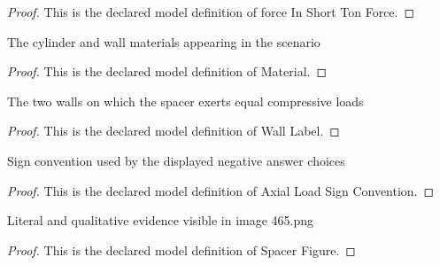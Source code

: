 \begin{proof}
  This is the declared model definition of force In Short Ton Force.
\end{proof}
\begin{definition}[Material]
  \label{def:physics:phyx-mini-0465:phyxminiproblems-problemphyxmini0465-material}
  The cylinder and wall materials appearing in the scenario
\end{definition}
\begin{proof}
  This is the declared model definition of Material.
\end{proof}
\begin{definition}
  \label{def:physics:phyx-mini-0465:phyxminiproblems-problemphyxmini0465-walllabel}
  The two walls on which the spacer exerts equal compressive loads
\end{definition}
\begin{proof}
  This is the declared model definition of Wall Label.
\end{proof}
\begin{definition}
  \label{def:physics:phyx-mini-0465:phyxminiproblems-problemphyxmini0465-axialloadsignconvention}
  Sign convention used by the displayed negative answer choices
\end{definition}
\begin{proof}
  This is the declared model definition of Axial Load Sign Convention.
\end{proof}
\begin{definition}
  \label{def:physics:phyx-mini-0465:phyxminiproblems-problemphyxmini0465-spacerfigure}
  Literal and qualitative evidence visible in image 465.png
\end{definition}
\begin{proof}
  This is the declared model definition of Spacer Figure.
\end{proof}

